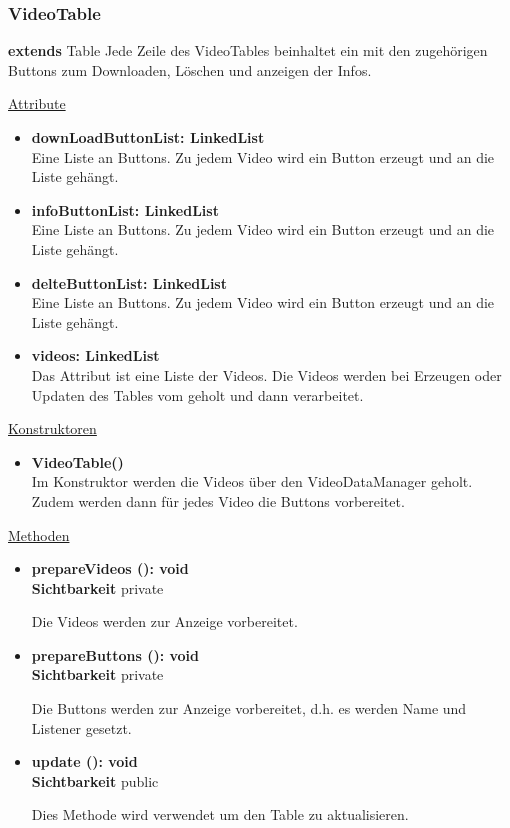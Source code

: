 \newpage
\subsubsection{VideoTable}\label{VideoTable}
\textbf{extends}  Table \newline
Jede Zeile des VideoTables beinhaltet ein  mit den zugehörigen Buttons zum Downloaden, Löschen und anzeigen der Infos. \newline

\underline{Attribute}
\begin{itemize}
\itemsep0pt

\item \textbf{downLoadButtonList: LinkedList} \hfill\\ 
Eine Liste an Buttons. Zu jedem Video wird ein Button erzeugt und an die Liste gehängt.

\item \textbf{infoButtonList: LinkedList} \hfill\\ 
Eine Liste an Buttons. Zu jedem Video wird ein Button erzeugt und an die Liste gehängt.

\item \textbf{delteButtonList: LinkedList} \hfill\\ 
Eine Liste an Buttons. Zu jedem Video wird ein Button erzeugt und an die Liste gehängt.

\item \textbf{videos: LinkedList} \hfill\\ 
Das Attribut ist eine Liste der Videos. Die Videos werden bei Erzeugen oder Updaten des Tables vom  geholt und dann verarbeitet.
\end{itemize}

\underline{Konstruktoren}
\begin{itemize}
\itemsep0pt

\item \textbf{VideoTable()} \hfill\\ 
Im Konstruktor werden die Videos über den VideoDataManager geholt. Zudem werden dann für jedes Video die Buttons vorbereitet.

\end{itemize}


\underline{Methoden}
\begin{itemize}
\itemsep0pt

\item \textbf{prepareVideos (): void}\hfill\\
\textbf{Sichtbarkeit} private

Die Videos werden zur Anzeige vorbereitet.

\item \textbf{prepareButtons (): void}\hfill\\
\textbf{Sichtbarkeit} private

Die Buttons werden zur Anzeige vorbereitet, d.h. es werden Name und Listener gesetzt.

\item \textbf{update (): void}\hfill\\
\textbf{Sichtbarkeit} public

Dies Methode wird verwendet um den Table zu aktualisieren.

\end{itemize}
